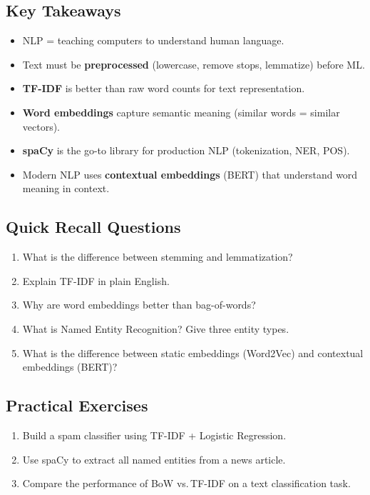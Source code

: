 \documentclass[12pt, a4paper, oneside]{book}
\begin{document}
\subsection{Key Takeaways}
\begin{itemize}[leftmargin=2em]
    \item NLP = teaching computers to understand human language.
    \item Text must be \textbf{preprocessed} (lowercase, remove stops, lemmatize) before ML.
    \item \textbf{TF-IDF} is better than raw word counts for text representation.
    \item \textbf{Word embeddings} capture semantic meaning (similar words = similar vectors).
    \item \textbf{spaCy} is the go-to library for production NLP (tokenization, NER, POS).
    \item Modern NLP uses \textbf{contextual embeddings} (BERT) that understand word meaning in context.
\end{itemize}

\subsection{Quick Recall Questions}
\begin{enumerate}[leftmargin=2em]
    \item What is the difference between stemming and lemmatization?
    \item Explain TF-IDF in plain English.
    \item Why are word embeddings better than bag-of-words?
    \item What is Named Entity Recognition? Give three entity types.
    \item What is the difference between static embeddings (Word2Vec) and contextual embeddings (BERT)?
\end{enumerate}

\subsection{Practical Exercises}
\begin{enumerate}[leftmargin=2em]
    \item Build a spam classifier using TF-IDF + Logistic Regression.
    \item Use spaCy to extract all named entities from a news article.
    \item Compare the performance of BoW vs.\,TF-IDF on a text classification task.
\end{enumerate}
\end{document}
